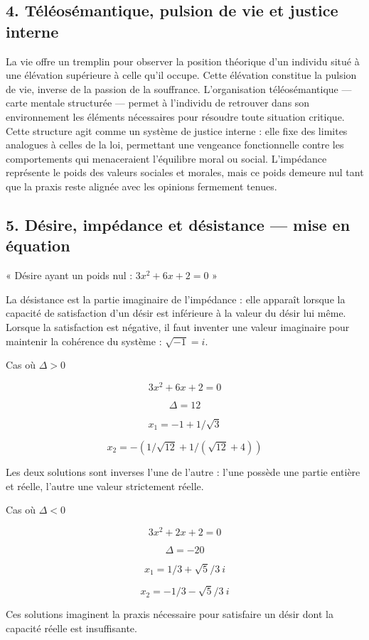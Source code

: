 \documentclass[12pt,letterpaper,oneside]{article}
\begin{document}
\subsection*{4. Téléosémantique, pulsion de vie et justice interne}
La vie offre un tremplin pour observer la position théorique d’un individu situé à une élévation supérieure à celle qu’il occupe. Cette élévation constitue la pulsion de vie, inverse de la passion de la souffrance. L’organisation téléosémantique — carte mentale structurée — permet à l’individu de retrouver dans son environnement les éléments nécessaires pour résoudre toute situation critique.
Cette structure agit comme un système de justice interne : elle fixe des limites analogues à celles de la loi, permettant une vengeance fonctionnelle contre les comportements qui menaceraient l’équilibre moral ou social. L’impédance représente le poids des valeurs sociales et morales, mais ce poids demeure nul tant que la praxis reste alignée avec les opinions fermement tenues.

\subsection*{5. Désire, impédance et désistance — mise en équation}
« Désire ayant un poids nul : $3x^2+6x+2=0$ »

La désistance est la partie imaginaire de l’impédance : elle apparaît lorsque la capacité de satisfaction d’un désir est inférieure à la valeur du désir lui même. Lorsque la satisfaction est négative, il faut inventer une valeur imaginaire pour maintenir la cohérence du système : $\sqrt{-1} = i$.

Cas où $\Delta > 0$

\[3x^2 + 6x + 2 = 0\]

\[\Delta = 12\]

\[x_1 = -1 + 1/\sqrt{3}\]

\[x_2 = -(1/\sqrt{12} + 1/(\sqrt{12} + 4))\]

Les deux solutions sont inverses l’une de l’autre : l’une possède une partie entière et réelle, l’autre une valeur strictement réelle.

Cas où $\Delta < 0$

\[3x^2 + 2x + 2 = 0\]

\[\Delta = -20\]

\[x_1 = 1/3 + \sqrt{5}/3\ i\]

\[x_2 = -1/3 - \sqrt{5}/3\ i\]

Ces solutions imaginent la praxis nécessaire pour satisfaire un désir dont la capacité réelle est insuffisante.
\end{document}
